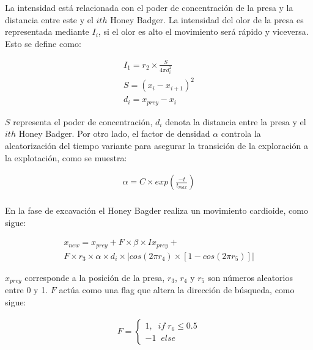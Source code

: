 \documentclass[conference]{IEEEtran}
\begin{document}
\noindent La intensidad está relacionada con el poder de concentración de la presa y la distancia entre este y el $ith$ Honey Badger. La intensidad del olor de la presa es representada mediante $I_i$, si el olor es alto el movimiento será rápido y viceversa. Esto se define como:

\begin{equation}
	\begin{gathered}
		I_1 = r_2 \times \frac{S}{4 \pi d_i^2}\\
		S = (x_i -x_{i+1})^2\\
		d_i = x_{prey} - x_i
	\end{gathered}
	\label{eq28}
\end{equation}

\noindent $S$ representa el poder de concentración, $d_i$ denota la distancia entre la presa y el $ith$ Honey Badger. Por otro lado, el factor de densidad $\alpha$ controla la aleatorización del tiempo variante para asegurar la transición de la exploración a la explotación, como se muestra:

\begin{equation}
	\begin{gathered}
		\alpha = C \times exp (\frac{-t}{t_{max}})\\
	\end{gathered}
	\label{eq29}
\end{equation}

\noindent En la fase de excavación el Honey Bagder realiza un movimiento cardioide, como sigue:

\begin{equation}
	\begin{gathered}
		x_{new}=x_{prey}+F \times \beta \times I x_{prey} + \\
		F \times r_3 \times \alpha \times d_i  \times |cos(2\pi r_4) \times [1-cos(2\pi r_5)]|
	\end{gathered}
	\label{eq30}
\end{equation}

\noindent $x_{prey}$ corresponde a la posición de la presa, $r_3$, $r_4$ y $r_5$ son números aleatorios entre 0 y 1. $F$ actúa como una flag que altera la dirección de búsqueda, como sigue:

\begin{equation}
	\begin{gathered}
		F=
		\begin{cases}
			1, \; \; if \; r_6 \leq 0.5 \\
			-1 \; \; else               
		\end{cases}
	\end{gathered}
	\label{eq31}
\end{equation}    
\end{document}
